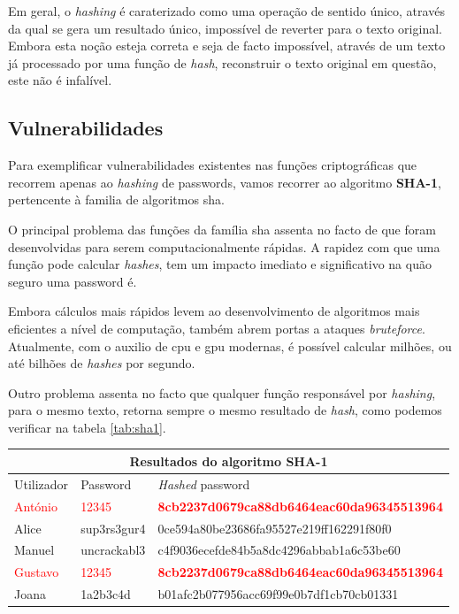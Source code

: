 Em geral, o \emph{hashing} é caraterizado como uma operação de sentido único, através da qual se gera um resultado único, impossível de reverter para o texto original.
Embora esta noção esteja correta e seja de facto impossível, através de um texto já processado por uma função de \emph{hash}, reconstruir o texto original em questão, este não é infalível.

\subsection{Vulnerabilidades} \label{vulnerabilidades}

Para exemplificar vulnerabilidades existentes nas funções criptográficas que recorrem apenas ao \emph{hashing} de passwords, vamos recorrer ao algoritmo \textbf{SHA-1}, pertencente à familia de algoritmos \gls{sha}.

O principal problema das funções da família \gls{sha} assenta no facto de que foram desenvolvidas para serem computacionalmente rápidas. A rapidez com que uma função pode calcular \emph{hashes}, tem um impacto imediato e significativo na quão seguro uma password é.

Embora cálculos mais rápidos levem ao desenvolvimento de algoritmos mais eficientes a nível de computação, também abrem portas a ataques \emph{bruteforce}. Atualmente, com o auxilio de \gls{cpu} e \gls{gpu} modernas, é possível calcular milhões, ou até bilhões de \emph{hashes} por segundo.

Outro problema assenta no facto que qualquer função responsável por \emph{hashing}, para o mesmo texto, retorna sempre o mesmo resultado de \emph{hash}, como podemos verificar na tabela \ref{tab:sha1}.

\begin{center}
    \begin{tabular}{ |p{2cm}|p{2cm}|p{8cm}|  }
        \hline
        \multicolumn{3}{|c|}{Resultados do algoritmo SHA-1} \\
        \hline
        Utilizador & Password & \emph{Hashed} password\\
        \hline
        \textcolor{red}{António} & \textcolor{red}{12345} & \textcolor{red}{\textbf{8cb2237d0679ca88db6464eac60da96345513964}}\\
        Alice & sup3rs3gur4 & 0ce594a80be23686fa95527e219ff162291f80f0\\
        Manuel & uncrackabl3 & c4f9036ecefde84b5a8dc4296abbab1a6c53be60\\
        \textcolor{red}{Gustavo} & \textcolor{red}{12345} & \textcolor{red}{\textbf{8cb2237d0679ca88db6464eac60da96345513964}}\\
        Joana & 1a2b3c4d & b01afc2b077956acc69f99e0b7df1cb70cb01331\\
        \hline
    \end{tabular}
\label{tab:sha1} 
\end{center}

